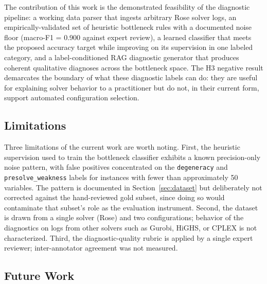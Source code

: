 \documentclass[11pt]{article}
\begin{document}
The contribution of this work is the demonstrated feasibility of the diagnostic pipeline: a working data parser that ingests arbitrary Rose solver logs, an empirically-validated set of heuristic bottleneck rules with a documented noise floor (macro-F1 = 0.900 against expert review), a learned classifier that meets the proposed accuracy target while improving on its supervision in one labeled category, and a label-conditioned RAG diagnostic generator that produces coherent qualitative diagnoses across the bottleneck space. The H3 negative result demarcates the boundary of what these diagnostic labels can do: they are useful for explaining solver behavior to a practitioner but do not, in their current form, support automated configuration selection.

\subsection{Limitations}

Three limitations of the current work are worth noting.
First, the heuristic supervision used to train the bottleneck classifier exhibits a known precision-only noise pattern, with false positives concentrated on the \texttt{degeneracy} and \texttt{presolve\_weakness} labels for instances with fewer than approximately 50 variables.
The pattern is documented in Section~\ref{sec:dataset} but deliberately not corrected against the hand-reviewed gold subset, since doing so would contaminate that subset's role as the evaluation instrument.
Second, the dataset is drawn from a single solver (Rose) and two configurations; behavior of the diagnostics on logs from other solvers such as Gurobi, HiGHS, or CPLEX is not characterized.
Third, the diagnostic-quality rubric is applied by a single expert reviewer; inter-annotator agreement was not measured.

\subsection{Future Work}
\end{document}
